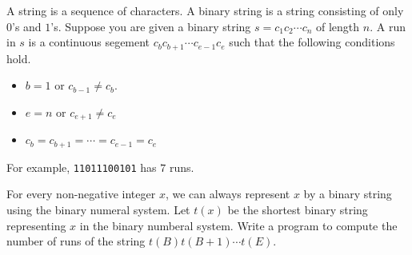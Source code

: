 A string is a sequence of characters.
A binary string is a string consisting of only $0$'s and $1$'s.
Suppose you are given a binary string $s=c_1c_2\cdots c_n$ of length $n$.
A run in $s$ is a continuous segement $c_{b}c_{b+1}\cdots c_{e-1}c_e$ such that the following conditions hold.
\begin{itemize}
\item $b=1$ or $c_{b-1}\neq c_b$. 
\item $e=n$ or $c_{e+1}\neq c_e$
\item $c_b=c_{b+1}=\cdots=c_{e-1}=c_e$
\end{itemize}
For example, \verb+11011100101+ has $7$ runs.

For every non-negative integer $x$, we can always represent $x$ by a binary string using the binary numeral system. 
Let $t(x)$ be the shortest binary string representing $x$ in the binary numberal system.
Write a program to compute the number of runs of the string $t(B)t(B+1)\cdots t(E)$.
